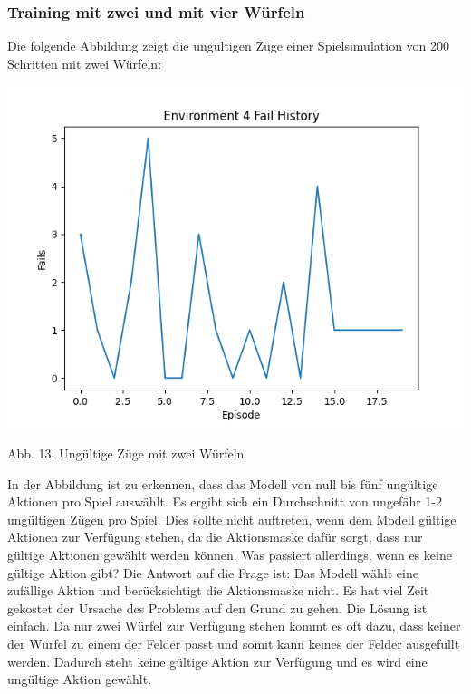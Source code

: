 \subsubsection{Training mit zwei und mit vier Würfeln}
\begin{minipage}{\linewidth}
Die folgende Abbildung zeigt die ungültigen Züge einer Spielsimulation von 200 Schritten mit zwei Würfeln:

	\vspace{0.5cm}
	\includegraphics[width=1\textwidth]{Bilder/failswithtwodice}
	
	Abb. 13: Ungültige Züge mit zwei Würfeln\\
\end{minipage}

In der Abbildung ist zu erkennen, dass das Modell von null bis fünf ungültige Aktionen pro Spiel auswählt. Es ergibt sich ein Durchschnitt von ungefähr 1-2 ungültigen Zügen pro Spiel. Dies sollte nicht auftreten, wenn dem Modell gültige Aktionen zur Verfügung stehen, da die Aktionsmaske dafür sorgt, dass nur gültige Aktionen gewählt werden können. Was passiert allerdings, wenn es keine gültige Aktion gibt? Die Antwort auf die Frage ist: Das Modell wählt eine zufällige Aktion und berücksichtigt die Aktionsmaske nicht. Es hat viel Zeit gekostet der Ursache des Problems auf den Grund zu gehen. Die Lösung ist einfach. Da nur zwei Würfel zur Verfügung stehen kommt es oft dazu, dass keiner der Würfel zu einem der Felder passt und somit kann keines der Felder ausgefüllt werden. Dadurch steht keine gültige Aktion zur Verfügung und es wird eine ungültige Aktion gewählt.

